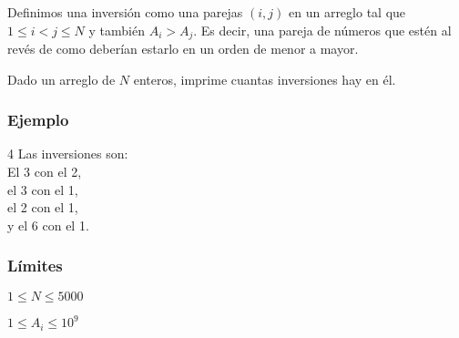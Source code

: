 Definimos una inversión como una parejas \((i,j)\) en un arreglo tal que \(1\leq i < j \leq N\) y también \(A_i > A_j\). Es decir, una pareja de números que estén al revés de como deberían estarlo en un orden de menor a mayor.

Dado un arreglo de \(N\) enteros, imprime cuantas inversiones hay en él.

\subsubsection*{Ejemplo}
\begin{casebox3}
	{4}
	{
		Las inversiones son: \\
		El 3 con el 2, \\
		el 3 con el 1,\\
		el 2 con el 1, \\
		y el 6 con el 1. 
	}	
\end{casebox3}
\subsubsection*{Límites}
\begin{plimits}
	\item \(1\leq N \leq 5000\)
	\item \(1\leq A_i \leq 10^9\)
\end{plimits}